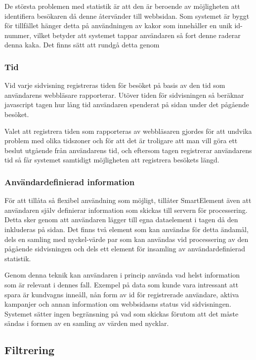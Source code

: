 De största problemen med statistik är att den är beroende av möjligheten att identifiera besökaren då denne återvänder till webbsidan. Som systemet är byggt för tillfället hänger detta på användningen av kakor som innehåller en unik id-nummer, vilket betyder att systemet tappar användaren så fort denne raderar denna kaka. Det finns sätt att rundgå detta genom 


\subsubsection{Tid}

Vid varje sidvisning registreras tiden för besöket på basis av den tid som användarens webbläsare rapporterar. Utöver tiden för sidvisningen så beräknar javascript tagen hur lång tid användaren spenderat på sidan under det pågående besöket.

Valet att registrera tiden som rapporteras av webbläsaren gjordes för att undvika problem med olika tidszoner och för att det är troligare att man vill göra ett beslut utgående från användarens tid, och eftersom tagen registrerar användarens tid så får systemet samtidigt möjligheten att registrera besökets längd.

\subsubsection{Användardefinierad information}

För att tillåta så flexibel användning som möjligt, tillåter SmartElement även att användaren själv definierar information som skickas till servern för processering. Detta sker genom att användaren lägger till egna dataelement i tagen då den inkluderas på sidan. Det finns två element som kan användas för detta ändamål, dels en samling med nyckel-värde par som kan användas vid processering av den pågående sidvisningen och dels ett element för insamling av användardefinierad statistik.

Genom denna teknik kan användaren i princip använda vad helst information som är relevant i dennes fall. Exempel på data som kunde vara intressant att spara är kundvagns inneåll, nån form av id för registrerade användare, aktiva kampanjer och annan information om webbsidasns status vid sidvisningen. Systemet sätter ingen begränsning på vad som skickas förutom att det måste sändas i formen av en samling av värden med nycklar.

\subsection{Filtrering}

